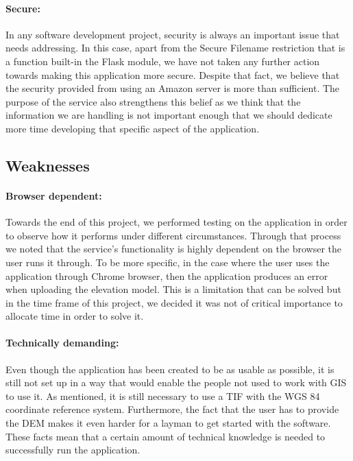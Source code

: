 \paragraph{Secure:} In any software development project, security is always an important issue that needs addressing. In this case, apart from the Secure Filename restriction that is a function built-in the Flask module, we have not taken any further action towards making this application more secure. Despite that fact, we believe that the security provided from using an Amazon server is more than sufficient.  The purpose of the service also strengthens this belief as we think that the information we are handling is not important enough that we should dedicate more time developing that specific aspect of the application.

\subsection{Weaknesses}
\paragraph{Browser dependent:} Towards the end of this project, we performed testing on the application in order to observe how it performs under different circumstances. Through that process we noted that the service's functionality is highly dependent on the browser the user runs it through. To be more specific, in the case where the user uses the application through Chrome browser, then the application produces an error when uploading the elevation model. This is a limitation that can be solved but in the time frame of this project, we decided it was not of critical importance to allocate time in order to solve it.

\paragraph{Technically demanding:} Even though the application has been created to be as usable as possible, it is still not set up in a way that would enable the people not used to work with GIS to use it. As mentioned, it is still necessary to use a TIF with the WGS 84 coordinate reference system. Furthermore, the fact that the user has to provide the DEM makes it even harder for a layman to get started with the software.  These facts mean that a certain amount of technical knowledge is needed to successfully run the application.

